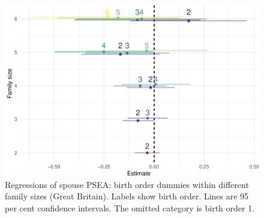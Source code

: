 \documentclass[
  12pt,
]{article}
\theoremstyle{definition}
\theoremstyle{definition}
\theoremstyle{definition}
\theoremstyle{definition}
\theoremstyle{remark}
\begin{document}
\begin{figure}

{\centering \includegraphics{trading-genetics_files/figure-latex/pic-bo-psea-interactions-1} 

}

\caption{Regressions of spouse PSEA: birth order dummies within different family sizes (Great Britain). Labels show birth order. Lines are 95 per cent confidence intervals. The omitted category is birth order 1.}\label{fig:pic-bo-psea-interactions}
\end{figure}

 
  \providecommand{\huxb}[2]{\arrayrulecolor[RGB]{#1}\global\arrayrulewidth=#2pt}
  \providecommand{\huxvb}[2]{\color[RGB]{#1}\vrule width #2pt}
  \providecommand{\huxtpad}[1]{\rule{0pt}{#1}}
  \providecommand{\huxbpad}[1]{\rule[-#1]{0pt}{#1}}
\end{document}
